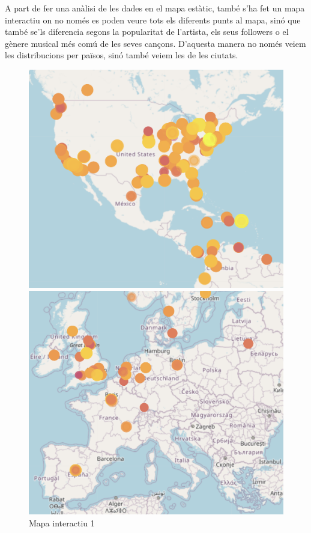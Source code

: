 
A part de fer una anàlisi de les dades en el mapa estàtic, també s'ha fet un mapa interactiu on no només es poden veure tots els diferents punts al mapa, sinó que també se'ls diferencia segons la popularitat de l'artista, els seus followers o el gènere musical més comú de les seves cançons. D'aquesta manera no només veiem les distribucions per països, sinó també veiem les de les ciutats.

\begin{figure}[H]
\centering
    \begin{minipage}{.5\textwidth}
        \centering
        \includegraphics[width=0.99\linewidth]{Images/7_Geospatial/1_descriptive/map_interactiu1.png}
        \caption{Mapa interactiu 1}
        \label{fig:geo_pop_country}
    \end{minipage}%
    \begin{minipage}{.5\textwidth}
        \centering
        \includegraphics[width=0.99\linewidth]{Images/7_Geospatial/1_descriptive/map_interactiu2.png}

\end{minipage}
\end{figure}
